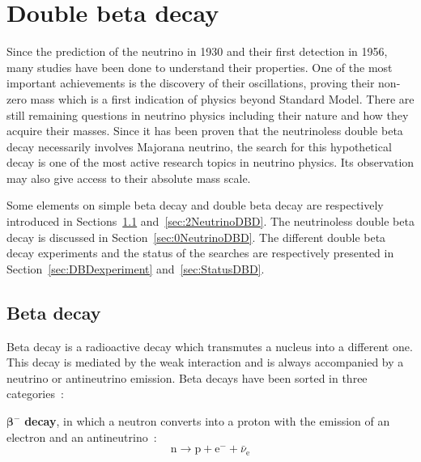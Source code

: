 \documentclass[main.tex]{subfiles}
\begin{document}
\chapter{Double beta decay}
 



\NI Since the prediction of the neutrino in 1930 and their first detection in 1956, many studies have been done to understand their properties. One of the most important achievements is the discovery of their oscillations, proving their non-zero mass which is a first indication of physics beyond Standard Model. There are still remaining questions in neutrino physics including their nature and how they acquire their masses. Since it has been proven that the neutrinoless double beta decay necessarily involves Majorana neutrino, the search for this hypothetical decay is one of the most active research topics in neutrino physics. Its observation may also give access to their absolute mass scale.


\bigskip


\NI Some elements on simple beta decay and double beta decay are respectively introduced in Sections~\ref{sec:betaDecay} and~\ref{sec:2NeutrinoDBD}. The neutrinoless double beta decay is discussed in Section~\ref{sec:0NeutrinoDBD}. The different double beta decay experiments and the status of the searches are respectively presented in Section~\ref{sec:DBDexperiment} and~\ref{sec:StatusDBD}.


\section{Beta decay}\label{sec:betaDecay}


\NI Beta decay is a radioactive decay which transmutes a nucleus into a different one. This decay is mediated by the weak interaction and is always accompanied by a neutrino or antineutrino emission. Beta decays have been sorted in three categories~:


\bigskip


\NI $\boldsymbol{\beta^-}$ \textbf{decay}, in which a neutron converts into a proton with the emission of an electron and an antineutrino~:
\begin{equation}
\text{n} \rightarrow \text{p} + \text{e}^- + \bar{\nu}_\text{e}
\end{equation}
\end{document}
